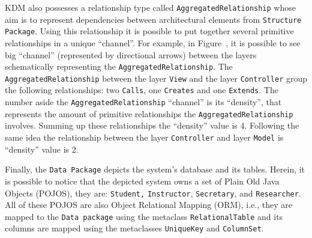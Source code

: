 KDM also possesses a relationship type called \texttt{AggregatedRelationship} whose aim is to represent dependencies between architectural elements from \texttt{Structure Package}. Using this relationship it is possible to put together several primitive relationships in a unique ``channel''. For example, in Figure~\cite{fig:system}, it is possible to see big ``channel'' (represented by directional arrows) between the layers schematically representing the \texttt{AggregatedRelationship}. The \texttt{AggregatedRelationship} between the layer \texttt{View} and the layer \texttt{Controller} group the following relationships: two \texttt{Calls}, one \texttt{Creates} and one \texttt{Extends}. The number aside the \texttt{AggregatedRelationship} ``channel'' is its ``density'', that represents the amount of primitive relationships the \texttt{AggregatedRelationship} involves. Summing up these relationships the ``density'' value is 4. Following the same idea the relationship between the layer \texttt{Controller} and layer \texttt{Model} is ``density'' value is 2. %

Finally, the \texttt{Data Package} depicts the system's database and its tables. Herein, it is possible to notice that the depicted system owns a set of Plain Old Java Objects (POJOS), they are: \texttt{Student,} \texttt{Instructor}, \texttt{Secretary}, and \texttt{Researcher}. All of these POJOS are also Object Relational Mapping (ORM), i.e., they are mapped to the \texttt{Data package} using the metaclass \texttt{RelationalTable} and its columns are mapped using the metaclasses \texttt{UniqueKey} and \texttt{ColumnSet}.

